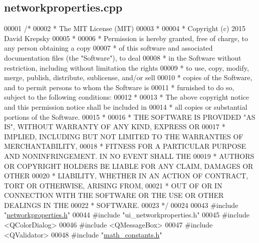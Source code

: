 \hypertarget{networkproperties_8cpp_source}{}\subsection{networkproperties.\+cpp}
\label{networkproperties_8cpp_source}

\begin{DoxyCode}
00001 \textcolor{comment}{/*}
00002 \textcolor{comment}{ * The MIT License (MIT)}
00003 \textcolor{comment}{ *}
00004 \textcolor{comment}{ * Copyright (c) 2015 David Krepsky}
00005 \textcolor{comment}{ *}
00006 \textcolor{comment}{ * Permission is hereby granted, free of charge, to any person obtaining a copy}
00007 \textcolor{comment}{ * of this software and associated documentation files (the "Software"), to deal}
00008 \textcolor{comment}{ * in the Software without restriction, including without limitation the rights}
00009 \textcolor{comment}{ * to use, copy, modify, merge, publish, distribute, sublicense, and/or sell}
00010 \textcolor{comment}{ * copies of the Software, and to permit persons to whom the Software is}
00011 \textcolor{comment}{ * furnished to do so, subject to the following conditions:}
00012 \textcolor{comment}{ *}
00013 \textcolor{comment}{ * The above copyright notice and this permission notice shall be included in}
00014 \textcolor{comment}{ * all copies or substantial portions of the Software.}
00015 \textcolor{comment}{ *}
00016 \textcolor{comment}{ * THE SOFTWARE IS PROVIDED "AS IS", WITHOUT WARRANTY OF ANY KIND, EXPRESS OR}
00017 \textcolor{comment}{ * IMPLIED, INCLUDING BUT NOT LIMITED TO THE WARRANTIES OF MERCHANTABILITY,}
00018 \textcolor{comment}{ * FITNESS FOR A PARTICULAR PURPOSE AND NONINFRINGEMENT. IN NO EVENT SHALL THE}
00019 \textcolor{comment}{ * AUTHORS OR COPYRIGHT HOLDERS BE LIABLE FOR ANY CLAIM, DAMAGES OR OTHER}
00020 \textcolor{comment}{ * LIABILITY, WHETHER IN AN ACTION OF CONTRACT, TORT OR OTHERWISE, ARISING FROM,}
00021 \textcolor{comment}{ * OUT OF OR IN CONNECTION WITH THE SOFTWARE OR THE USE OR OTHER DEALINGS IN THE}
00022 \textcolor{comment}{ * SOFTWARE.}
00023 \textcolor{comment}{ */}
00024 
00043 \textcolor{preprocessor}{#include "\hyperlink{networkproperties_8h}{networkproperties.h}"}
00044 \textcolor{preprocessor}{#include "ui\_networkproperties.h"}
00045 \textcolor{preprocessor}{#include <QColorDialog>}
00046 \textcolor{preprocessor}{#include <QMessageBox>}
00047 \textcolor{preprocessor}{#include <QValidator>}
00048 \textcolor{preprocessor}{#include "\hyperlink{math__constants_8h}{math\_constants.h}"}

\end{DoxyCode}
